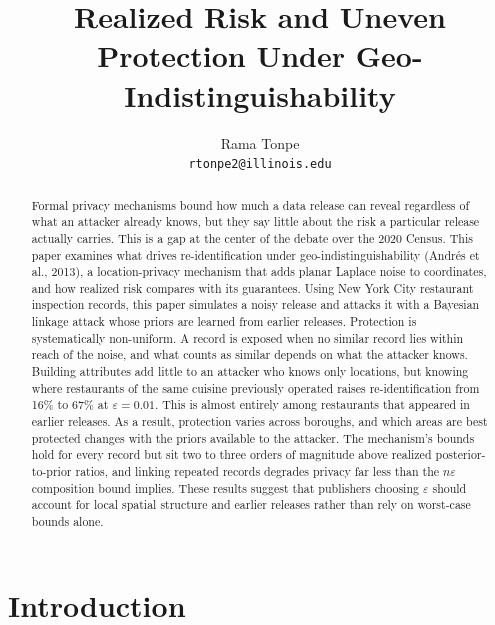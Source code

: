 \documentclass[11pt]{article}
\title{Realized Risk and Uneven Protection Under Geo-Indistinguishability}
\author{Rama Tonpe \\ \texttt{rtonpe2@illinois.edu}}
\date{}
\begin{document}
\maketitle

\begin{abstract}
Formal privacy mechanisms bound how much a data release can reveal regardless of what an attacker already knows, but they say little about the risk a particular release actually carries. This is a gap at the center of the debate over the 2020 Census. This paper examines what drives re-identification under geo-indistinguishability (Andr\'es et al., 2013), a location-privacy mechanism that adds planar Laplace noise to coordinates, and how realized risk compares with its guarantees. Using New York City restaurant inspection records, this paper simulates a noisy release and attacks it with a Bayesian linkage attack whose priors are learned from earlier releases. Protection is systematically non-uniform. A record is exposed when no similar record lies within reach of the noise, and what counts as similar depends on what the attacker knows. Building attributes add little to an attacker who knows only locations, but knowing where restaurants of the same cuisine previously operated raises re-identification from 16\% to 67\% at $\varepsilon = 0.01$. This is almost entirely among restaurants that appeared in earlier releases. As a result, protection varies across boroughs, and which areas are best protected changes with the priors available to the attacker. The mechanism's bounds hold for every record but sit two to three orders of magnitude above realized posterior-to-prior ratios, and linking repeated records degrades privacy far less than the $n\varepsilon$ composition bound implies. These results suggest that publishers choosing $\varepsilon$ should account for local spatial structure and earlier releases rather than rely on worst-case bounds alone.
\end{abstract}

\section{Introduction}
\end{document}
